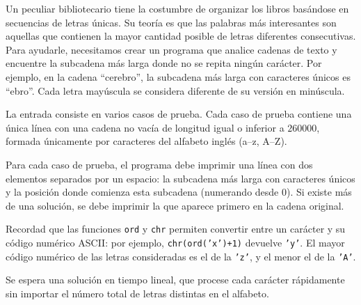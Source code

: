 
\Statement

Un peculiar bibliotecario tiene la costumbre de organizar los libros basándose en secuencias de letras únicas. Su teoría es que las palabras más interesantes son aquellas que contienen la mayor cantidad posible de letras diferentes consecutivas.  Para ayudarle, necesitamos crear un programa que analice cadenas de texto y encuentre la subcadena más larga donde no se repita ningún carácter. Por ejemplo, en la cadena ``cerebro'', la subcadena más larga con caracteres únicos es ``ebro''.
Cada letra mayúscula se considera diferente de su versión en minúscula.

\Input

La entrada consiste en varios casos de prueba. Cada caso de prueba contiene una única línea con una cadena no vacía de longitud igual o inferior a $260000$, formada únicamente por caracteres del alfabeto inglés (a--z, A--Z).

\Output

Para cada caso de prueba, el programa debe imprimir una línea con dos elementos separados por un espacio:
la subcadena más larga con caracteres únicos y la posición donde comienza esta subcadena (numerando desde 0).
Si existe más de una solución, se debe imprimir la que aparece primero en la cadena original.

\Sample

\Observation

Recordad que las funciones \texttt{ord} y \texttt{chr} permiten convertir entre un carácter y su código numérico ASCII: por ejemplo, \texttt{chr(ord('x')+1)} devuelve \texttt{'y'}. El mayor código numérico de las letras consideradas es el de la \texttt{'z'}, y el menor el de la \texttt{'A'}.

\Observation

Se espera una solución en tiempo lineal, que procese cada carácter rápidamente sin importar el número total de letras distintas en el alfabeto.